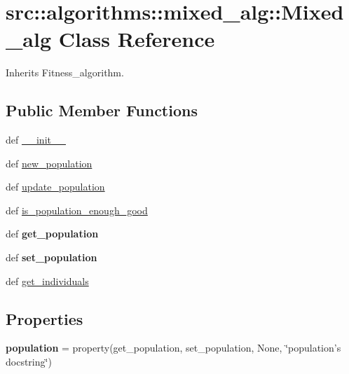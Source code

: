 \hypertarget{classsrc_1_1algorithms_1_1mixed__alg_1_1Mixed__alg}{
\section{src::algorithms::mixed\_\-alg::Mixed\_\-alg Class Reference}
\label{classsrc_1_1algorithms_1_1mixed__alg_1_1Mixed__alg}
}


Inherits Fitness\_\-algorithm.

\subsection*{Public Member Functions}
\begin{DoxyCompactItemize}
\item 
def \hyperlink{classsrc_1_1algorithms_1_1mixed__alg_1_1Mixed__alg_a556df55f7266449cf1a97dcae1001ff2}{\_\-\_\-init\_\-\_\-}
\item 
def \hyperlink{classsrc_1_1algorithms_1_1mixed__alg_1_1Mixed__alg_a43cf8eb3e6960429755c1bf83b388a84}{new\_\-population}
\item 
def \hyperlink{classsrc_1_1algorithms_1_1mixed__alg_1_1Mixed__alg_a93da1c446c5f85c2cc84aca076db34b4}{update\_\-population}
\item 
def \hyperlink{classsrc_1_1algorithms_1_1mixed__alg_1_1Mixed__alg_a16380c0fe29c857f8d294a0c3535f2a5}{is\_\-population\_\-enough\_\-good}
\item 
\hypertarget{classsrc_1_1algorithms_1_1mixed__alg_1_1Mixed__alg_a54b2ea3da0c421ab92beb4dbf2687141}{
def {\bfseries get\_\-population}}
\label{classsrc_1_1algorithms_1_1mixed__alg_1_1Mixed__alg_a54b2ea3da0c421ab92beb4dbf2687141}

\item 
\hypertarget{classsrc_1_1algorithms_1_1mixed__alg_1_1Mixed__alg_a287983553ee5255df287cb02184ffb79}{
def {\bfseries set\_\-population}}
\label{classsrc_1_1algorithms_1_1mixed__alg_1_1Mixed__alg_a287983553ee5255df287cb02184ffb79}

\item 
def \hyperlink{classsrc_1_1algorithms_1_1mixed__alg_1_1Mixed__alg_ab73eb6fb557e8f05cb3382ec7ecc0de6}{get\_\-individuals}
\end{DoxyCompactItemize}
\subsection*{Properties}
\begin{DoxyCompactItemize}
\item 
\hypertarget{classsrc_1_1algorithms_1_1mixed__alg_1_1Mixed__alg_a6edced5b38938c3f643d1829f117f391}{
{\bfseries population} = property(get\_\-population, set\_\-population, None, \char`\"{}population's docstring\char`\"{})}
\label{classsrc_1_1algorithms_1_1mixed__alg_1_1Mixed__alg_a6edced5b38938c3f643d1829f117f391}

\end{DoxyCompactItemize}


